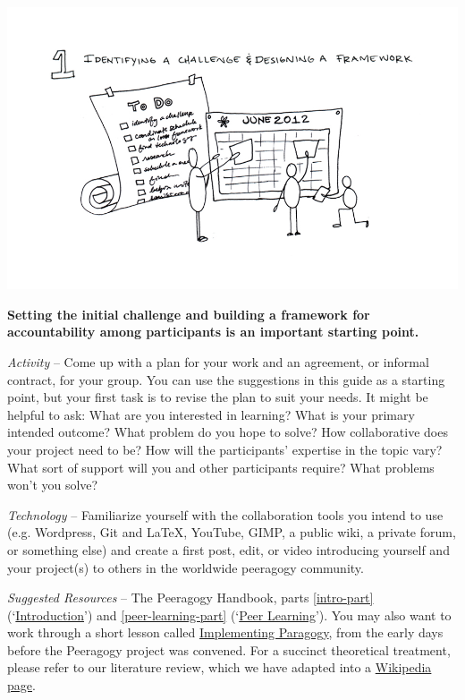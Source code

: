 \begin{center}
\includegraphics{../pictures/OpenBook-2-1.jpg}
\end{center}


\textbf{Setting the initial challenge and building a framework for
accountability among participants is an important starting point.}

\medskip

\emph{Activity} -- Come up with a plan for your work and an agreement,
or informal contract, for your group. You can use the suggestions in
this guide as a starting point, but your first task is to revise the
plan to suit your needs. It might be helpful to ask: What are you
interested in learning? What is your primary intended outcome? What
problem do you hope to solve? How collaborative does your project need
to be? How will the participants' expertise in the topic vary? What sort
of support will you and other participants require? What problems won't
you solve?

\medskip

\emph{Technology} -- Familiarize yourself with the collaboration tools
you intend to use (e.g. Wordpress, Git and \LaTeX, YouTube, GIMP, a
public wiki, a private forum, or something else) and create a first
post, edit, or video introducing yourself and your project(s) to others
in the worldwide peeragogy community.

\medskip

\emph{Suggested Resources} -- The Peeragogy Handbook, parts \ref{intro-part}
(`\href{http://peeragogy.org/}{Introduction}') and \ref{peer-learning-part}
(`\href{http://peeragogy.org/peer-learning/}{Peer Learning}'). You may
also want to work through a short lesson called
\href{https://en.wikiversity.org/wiki/User:Arided/ImplementingParagogy}{Implementing
Paragogy}, from the early days before the Peeragogy project was
convened. For a succinct theoretical treatment, please refer to our
literature review, which we have adapted into a
\href{http://en.wikipedia.org/wiki/Peer\_learning}{Wikipedia page}.

